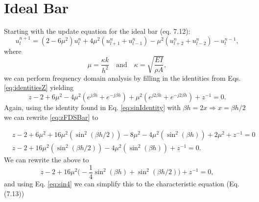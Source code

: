 \documentclass{article}
\begin{document}
\section{Ideal Bar}
Starting with the update equation for the ideal bar (eq. 7.12):
\begin{equation}
    u_l^{n+1}=(2-6\mu^2)u_l^n+4\mu^2(u_{l+1}^n+u_{l-1}^n)-\mu^2(u_{l+2}^n+u_{l-2}^n)-u_l^{n-1},
\end{equation}
where 
\begin{equation}\label{eq:mu}
    \mu = \frac{\kappa k}{h^2} \quad \text{and} \quad \kappa = \sqrt{\frac{EI}{\rho A}},
\end{equation}
we can perform frequency domain analysis by filling in the identities from Eqs. \eqref{eq:identitiesZ} yielding
\begin{equation}\label{eq:zFDSBar}
    z-2+6\mu^2-4\mu^2(e^{j\beta h}+e^{-j\beta h}) + \mu^2 (e^{j2\beta h}+e^{-j2\beta h}) + z^{-1} = 0.
\end{equation}
Again, using the identity found in Eq. \eqref{eq:sinIdentity} with $\beta h = 2x \Rightarrow x = \beta h / 2$ we can rewrite \eqref{eq:zFDSBar} to

\begin{equation}\nonumber
    \begin{aligned}
        &z-2+6\mu^2+16\mu^2(\sin^2(\beta h / 2)) - 8\mu^2  -4 \mu^2 (\sin^2(\beta h)) + 2\mu^2 + z^{-1} = 0\\
        &z-2+16\mu^2(\sin^2(\beta h / 2)) -4 \mu^2 (\sin^2(\beta h)) + z^{-1} = 0.
    \end{aligned}  
\end{equation}
We can rewrite the above to
\begin{equation}\nonumber
    z-2+16\mu^2\bigg(-\frac{1}{4}\sin^2(\beta h)+\sin^2(\beta h / 2)\bigg) + z^{-1} = 0,
\end{equation}
and using Eq. \eqref{eq:sin4} we can simplify this to the characteristic equation (Eq. (7.13))
\end{document}
